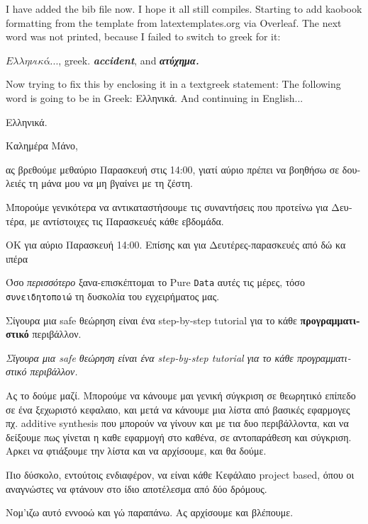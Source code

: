 \documentclass[fontsize=10pt, twoside=false, numbers=noenddot]{kaobook}
\begin{document}
I have added the bib file now.  I hope it all still compiles.  Starting to add kaobook formatting from the template from latextemplates.org via Overleaf.  The next word was not printed, because I failed to switch to greek for it:

\(Ελληνικά ...\), greek. \textbf{\textit{accident}}, and \textbf{\textit{ατύχημα.}}

Now trying to fix this by enclosing it in a textgreek statement:
The following word is going to be in Greek: \textgreek{Ελληνικά}. And continuing in English...


\begin{greek}
  Ελληνικά.

  Καλημέρα Μάνο,

    ας βρεθούμε μεθαύριο \textsf{Παρασκευή} στις 14:00, γιατί αύριο πρέπει να βοηθήσω σε δουλειές τη μάνα μου να μη βγαίνει με τη ζέστη.

    Μπορούμε γενικότερα να αντικαταστήσουμε τις συναντήσεις που προτείνω για Δευτέρα, με αντίστοιχες τις Παρασκευές κάθε εβδομάδα.


ΟΚ για αύριο Παρασκευή 14:00.
Επίσης και για Δευτέρες-παρασκευές από δώ κα ιπέρα

    Όσο \textit{περισσότερο} ξανα-επισκέπτομαι το Pure \texttt{Data} αυτές τις μέρες, τόσο \texttt{συνειδητοποιώ} τη δυσκολία του εγχειρήματος μας.

    Σίγουρα μια safe θεώρηση είναι ένα step-by-step tutorial για το κάθε \textbf{προγραμματιστικό} περιβάλλον.

\textit{Σίγουρα μια safe θεώρηση είναι ένα step-by-step tutorial για το κάθε προγραμματιστικό περιβάλλον.}


Ας το δούμε μαζί. Μπορούμε να κάνουμε μαι γενική σύγκριση σε θεωρητικό επίπεδο σε ένα ξεχωριστό κεφαλαιο,
και μετά να κάνουμε μια λίστα από βασικές εφαρμογες πχ. additive synthesis που μπορούν να γίνουν και με τια
δυο περιβάλλοντα, και να δείξουμε πως γίνεται η καθε εφαρμογή στο καθένα, σε αντοπαράθεση και σύγκριση.
Αρκει να φτιάξουμε την λίστα και να αρχίσουμε, και θα δούμε.

    Πιο δύσκολο, εντούτοις ενδιαφέρον, να είναι κάθε Κεφάλαιο project based, όπου οι αναγνώστες να φτάνουν στο ίδιο αποτέλεσμα από δύο δρόμους.


Νομ'ιζω αυτό εννοοώ και γώ παραπάνω. Ας αρχίσουμε και βλέπουμε.
\end{greek}
\end{document}

